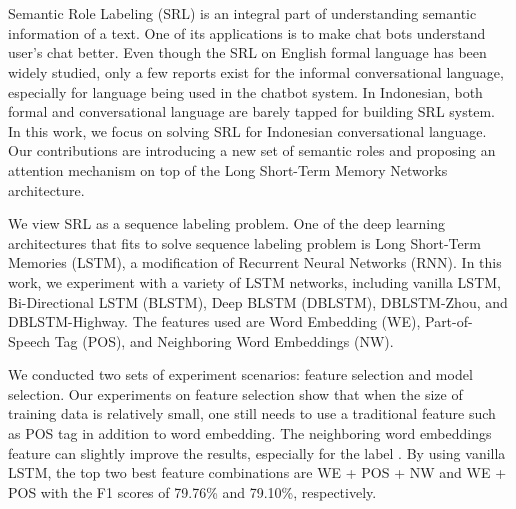 \chapter{\babEnam}

Semantic Role Labeling (SRL) is an integral part of understanding semantic information of a text. One of its applications is to make chat bots understand user's chat better. Even though the SRL on English formal language has been widely studied, only a few reports exist for the informal conversational language, especially for language being used in the chatbot system. In Indonesian, both formal and conversational language are barely tapped for building SRL system. In this work, we focus on solving SRL for Indonesian conversational language. Our contributions are introducing a new set of semantic roles and proposing an attention mechanism on top of the Long Short-Term Memory Networks architecture. 

We view SRL as a sequence labeling problem. One of the deep learning architectures that fits to solve sequence labeling problem is Long Short-Term Memories (LSTM), a modification of Recurrent Neural Networks (RNN). In this work, we experiment with a variety of LSTM networks, including vanilla LSTM, Bi-Directional LSTM (BLSTM), Deep BLSTM (DBLSTM), DBLSTM-Zhou, and DBLSTM-Highway. The features used are Word Embedding (WE), Part-of-Speech Tag (POS), and Neighboring Word Embeddings (NW).

We conducted two sets of experiment scenarios: feature selection and model selection. Our experiments on feature selection show that when the size of training data is relatively small, one still needs to use a traditional feature such as POS tag in addition to word embedding. The neighboring word embeddings feature can slightly improve the results, especially for the label \greet. By using vanilla LSTM, the top two best feature combinations are WE + POS + NW and WE + POS with the F1 scores of 79.76\% and 79.10\%, respectively.

